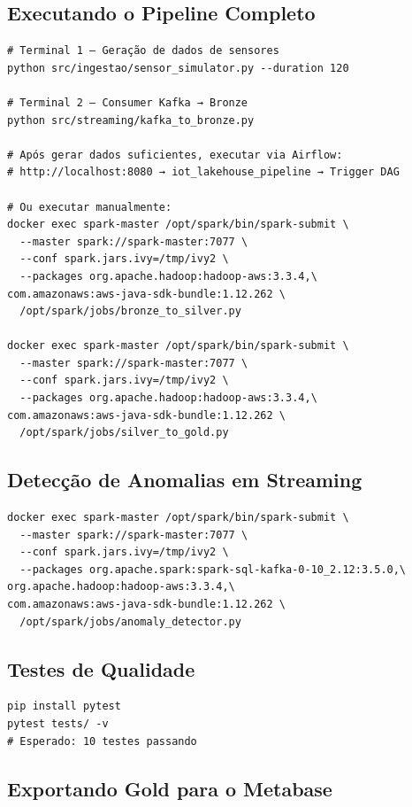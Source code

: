 \subsection{Executando o Pipeline Completo}

\begin{verbatim}
# Terminal 1 — Geração de dados de sensores
python src/ingestao/sensor_simulator.py --duration 120

# Terminal 2 — Consumer Kafka → Bronze
python src/streaming/kafka_to_bronze.py

# Após gerar dados suficientes, executar via Airflow:
# http://localhost:8080 → iot_lakehouse_pipeline → Trigger DAG

# Ou executar manualmente:
docker exec spark-master /opt/spark/bin/spark-submit \
  --master spark://spark-master:7077 \
  --conf spark.jars.ivy=/tmp/ivy2 \
  --packages org.apache.hadoop:hadoop-aws:3.3.4,\
com.amazonaws:aws-java-sdk-bundle:1.12.262 \
  /opt/spark/jobs/bronze_to_silver.py

docker exec spark-master /opt/spark/bin/spark-submit \
  --master spark://spark-master:7077 \
  --conf spark.jars.ivy=/tmp/ivy2 \
  --packages org.apache.hadoop:hadoop-aws:3.3.4,\
com.amazonaws:aws-java-sdk-bundle:1.12.262 \
  /opt/spark/jobs/silver_to_gold.py
\end{verbatim}

\subsection{Detecção de Anomalias em Streaming}

\begin{verbatim}
docker exec spark-master /opt/spark/bin/spark-submit \
  --master spark://spark-master:7077 \
  --conf spark.jars.ivy=/tmp/ivy2 \
  --packages org.apache.spark:spark-sql-kafka-0-10_2.12:3.5.0,\
org.apache.hadoop:hadoop-aws:3.3.4,\
com.amazonaws:aws-java-sdk-bundle:1.12.262 \
  /opt/spark/jobs/anomaly_detector.py
\end{verbatim}

\subsection{Testes de Qualidade}

\begin{verbatim}
pip install pytest
pytest tests/ -v
# Esperado: 10 testes passando
\end{verbatim}

\subsection{Exportando Gold para o Metabase}

